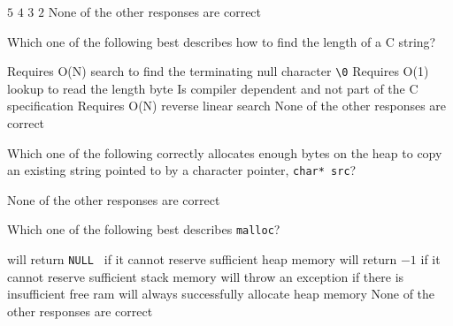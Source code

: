 \begin{answers}
\correctanswer $5$
\answer $4$
\answer $3$
\answer $2$
\answer None of the other responses are correct
\end{answers}
\begin{solution}
\end{solution}


\variant
Which one of the following best describes how to find the length of a C string?
\begin{answers}
\correctanswer Requires O(N) search to find the terminating null character {\tt \textbackslash0}
\answer  Requires O(1) lookup to read the length byte
\answer Is compiler dependent and not part of the C specification
\answer Requires O(N) reverse linear search
\answer None of the other responses are correct
\end{answers}
\begin{solution}
\end{solution}


\variant
Which one of the following correctly allocates enough bytes on the heap to copy an existing string pointed to by a character pointer, {\tt char* src}?
\begin{answers}
\answer None of the other responses are correct
\end{answers}
\begin{solution}
\end{solution}


\variant
Which one of the following best describes {\tt malloc}?
\begin{answers}
 will return {\tt NULL } if it cannot reserve sufficient heap memory
 will return $-1$ if it cannot reserve sufficient stack memory
 will throw an exception if there is insufficient free ram
 will always successfully allocate heap memory
\answer None of the other responses are correct
\end{answers}
\begin{solution}
\end{solution}



